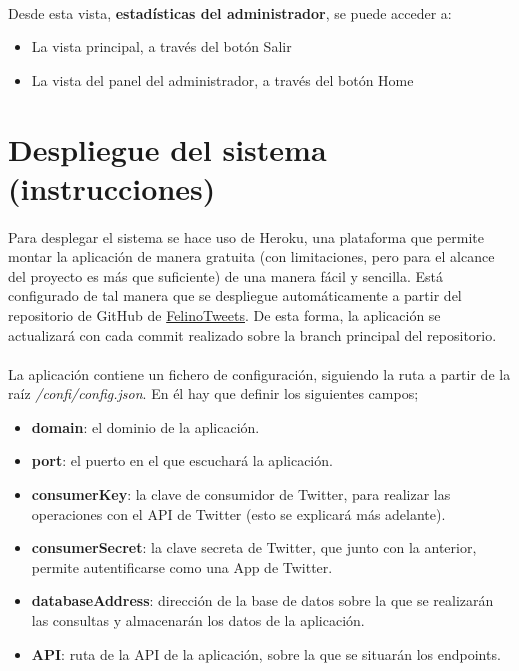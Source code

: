 \documentclass[a4paper]{article}
\begin{document}
\paragraph{} Desde esta vista, \textbf{estadísticas del administrador}, se puede acceder a:
\begin{itemize}
	\item La vista principal, a través del botón Salir
	\item La vista del panel del administrador, a través del botón Home
\end{itemize}
\section{Despliegue del sistema (instrucciones)}
\paragraph{}Para desplegar el sistema se hace uso de Heroku, una plataforma que permite montar la aplicación de manera gratuita (con limitaciones, pero para el alcance del proyecto es más que suficiente) de una manera fácil y sencilla. Está configurado de tal manera que se despliegue automáticamente a partir del repositorio de GitHub de \href{https://github.com/FelinoSoft/FelinoTweets}{FelinoTweets}. De esta forma, la aplicación se actualizará con cada commit realizado sobre la branch principal del repositorio.
\paragraph{}La aplicación contiene un fichero de configuración, siguiendo la ruta a partir de la raíz \textit{/confi/config.json}. En él hay que definir los siguientes campos;
\begin{itemize}
\item \textbf{domain}: el dominio de la aplicación.
\item \textbf{port}: el puerto en el que escuchará la aplicación.
\item \textbf{consumerKey}: la clave de consumidor de Twitter, para realizar las operaciones con el API de Twitter (esto se explicará más adelante).
\item \textbf{consumerSecret}: la clave secreta de Twitter, que junto con la anterior, permite autentificarse como una App de Twitter.
\item \textbf{databaseAddress}: dirección de la base de datos sobre la que se realizarán las consultas y almacenarán los datos de la aplicación.
\item \textbf{API}: ruta de la API de la aplicación, sobre la que se situarán los endpoints.
\end{itemize}
\end{document}

